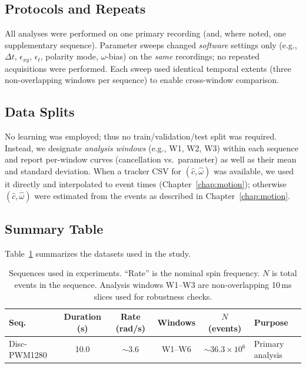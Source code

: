 \subsection{Protocols and Repeats}
All analyses were performed on one primary recording (and, where noted, one supplementary sequence). Parameter sweeps changed \emph{software} settings only (e.g., $\Delta t$, $\epsilon_{xy}$, $\epsilon_t$, polarity mode, $\omega$-bias) on the \emph{same} recordings; no repeated acquisitions were performed. Each sweep used identical temporal extents (three non-overlapping windows per sequence) to enable cross-window comparison.

\subsection{Data Splits}
No learning was employed; thus no train/validation/test split was required. Instead, we designate \emph{analysis windows} (e.g., W1, W2, W3) within each sequence and report per-window curves (cancellation vs.\ parameter) as well as their mean and standard deviation. When a tracker CSV for $(\hat c,\hat\omega)$ was available, we used it directly and interpolated to event times (Chapter~\ref{chap:motion}); otherwise $(\hat c,\hat\omega)$ were estimated from the events as described in Chapter~\ref{chap:motion}.

\subsection{Summary Table}
Table~\ref{tab:sequences} summarizes the datasets used in the study.

\vspace{0.5\baselineskip}
\begin{table}[H]
  \centering
  \small
  \caption{Sequences used in experiments. ``Rate'' is the nominal spin frequency. $N$ is total events in the sequence. Analysis windows W1--W3 are non-overlapping 10\,ms slices used for robustness checks.}
  \label{tab:sequences}
  \begin{tabularx}{\linewidth}{@{} l c c c c X @{} }
    \toprule
    \textbf{Seq.} & \textbf{Duration (s)} & \textbf{Rate (rad/s)} & \textbf{Windows} & \textbf{$N$ (events)} & \textbf{Purpose} \\
    \midrule
    Disc-PWM1280 & 10.0 & $\sim 3.6$ & W1--W6 & $\sim 36.3 \times 10^6$ & Primary analysis \\
    \bottomrule
  \end{tabularx}
\end{table}


